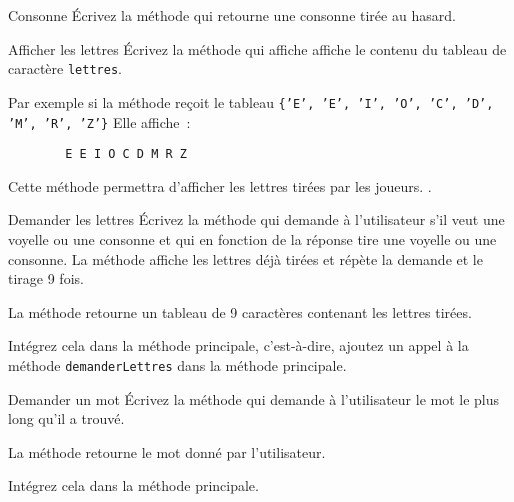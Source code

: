 \documentclass[a4paper,11pt]{style-esi/td}
\begin{document}
 	\begin{Exercice}{Consonne}
		\'Ecrivez la méthode  qui retourne une consonne 
		tirée au hasard.
	\end{Exercice} 

 	\begin{Exercice}{Afficher les lettres}
 		\'Ecrivez la méthode 
		qui affiche affiche le contenu du tableau de caractère \texttt{lettres}.
		
		Par exemple si la méthode reçoit le tableau 
		\texttt{\{'E', 'E', 'I', 'O', 'C', 'D', 'M', 'R', 'Z'\}}
		Elle affiche~:
		
		\begin{verbatim}
		E E I O C D M R Z
		\end{verbatim}
		
		Cette méthode permettra d'afficher les lettres tirées par les joueurs.
.
	\end{Exercice} 

 	\begin{Exercice}{Demander les lettres}
		\'Ecrivez la méthode 
		qui demande à l'utilisateur s'il veut une voyelle ou une consonne
		et qui en fonction de la réponse tire une voyelle ou une consonne.
		La méthode affiche les lettres déjà tirées et répète la demande
		et le tirage 9 fois.
		 
		La méthode retourne un tableau de 9 caractères contenant les lettres tirées. 
		
		Intégrez cela dans la méthode principale, c'est-à-dire, ajoutez un appel à 
		la méthode \texttt{demanderLettres} dans la méthode principale.
	\end{Exercice} 

	
 	\begin{Exercice}{Demander un mot}
		\'Ecrivez la méthode 
		qui demande à l'utilisateur le mot le plus long qu'il a trouvé.
		 
		La méthode retourne le mot donné par l'utilisateur. 
		
		Intégrez cela dans la méthode principale.
	\end{Exercice} 
	
\end{document}
